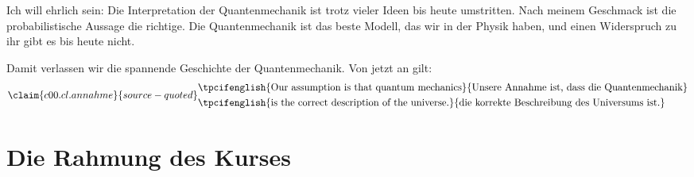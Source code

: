 Ich will ehrlich sein: Die Interpretation der Quantenmechanik ist trotz vieler Ideen bis
heute umstritten. Nach meinem Geschmack ist die probabilistische Aussage die richtige. Die Quantenmechanik ist das beste Modell, das wir in
der Physik haben, und einen Widerspruch zu ihr gibt es bis heute nicht.

Damit verlassen wir die spannende Geschichte der Quantenmechanik. Von jetzt an gilt:
\begin{equation}\label{c00.eq.annahme}\claim{c00.cl.annahme}{source-quoted}
  \begin{aligned}
    &\text{\tpcifenglish{Our assumption is that quantum mechanics}{Unsere Annahme ist, dass die Quantenmechanik}} \\
    &\text{\tpcifenglish{is the correct description of the universe.}{die korrekte Beschreibung des Universums ist.}}
  \end{aligned}
\end{equation}

\section{Die Rahmung des Kurses}\label{c00.s1}

